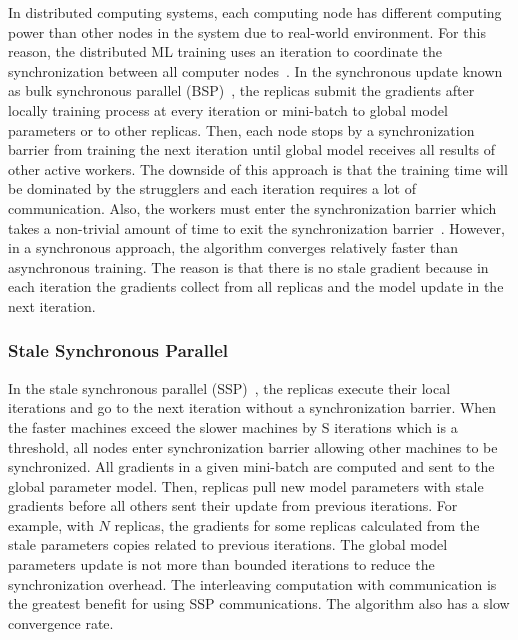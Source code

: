 \documentclass[conference]{IEEEtran}
\begin{document}
In distributed computing systems, each computing node has different computing power than other nodes in the system due to real-world environment. For this reason, the distributed ML training uses an iteration to coordinate the synchronization between all computer nodes~\cite{zhang2017parameter}. In the synchronous update known as bulk synchronous parallel (BSP)~\cite{BSP}, the replicas submit the gradients after locally training process at every iteration or mini-batch to global model parameters or to other replicas. Then, each node stops by a synchronization barrier from training the next iteration until global model receives all results of other active workers. The downside of this approach is that the training time will be dominated by the strugglers and each iteration requires a lot of communication. Also, the workers must enter the synchronization barrier which takes a non-trivial amount of time to exit the synchronization barrier~\cite{xing2016strategies}. However, in a synchronous approach, the algorithm converges relatively faster than asynchronous training. The reason is that there is no stale gradient because in each iteration the gradients collect from all replicas and the model update in the next iteration. 

\subsubsection{Stale Synchronous Parallel}
\label{sec:ssp}

In the stale synchronous parallel (SSP)~\cite{ho2013more}, the replicas execute their local iterations and go to the next iteration without a synchronization barrier. When the faster machines exceed the slower machines by S iterations which is a threshold, all nodes enter synchronization barrier allowing other machines to be synchronized. All gradients in a given mini-batch are computed and sent to the global parameter model. Then, replicas pull new model parameters with stale gradients before all others sent their update from previous iterations. For example, with $N$ replicas, the gradients for some replicas calculated from the stale parameters copies related to previous iterations. The global model parameters update is not more than bounded iterations to reduce the synchronization overhead. The interleaving computation with communication is the greatest benefit for using SSP communications. The algorithm also has a slow convergence rate.


\end{document}
